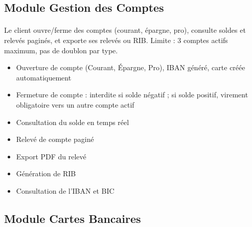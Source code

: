 \documentclass[12pt,a4paper]{report}
\begin{document}
\subsection{Module Gestion des Comptes}
\paragraph{}Le client ouvre/ferme des comptes (courant, épargne, pro), consulte soldes et relevés paginés, et exporte ses relevés ou RIB. Limite : 3 comptes actifs maximum, pas de doublon par type.
\begin{itemize}[leftmargin=1.5cm]
    \item Ouverture de compte (Courant, Épargne, Pro), IBAN généré, carte créée automatiquement
    \item Fermeture de compte : interdite si solde négatif ; si solde positif, virement obligatoire vers un autre compte actif
    \item Consultation du solde en temps réel
    \item Relevé de compte paginé
    \item Export PDF du relevé
    \item Génération de RIB
    \item Consultation de l'IBAN et BIC
\end{itemize}

\subsection{Module Cartes Bancaires}
\end{document}
